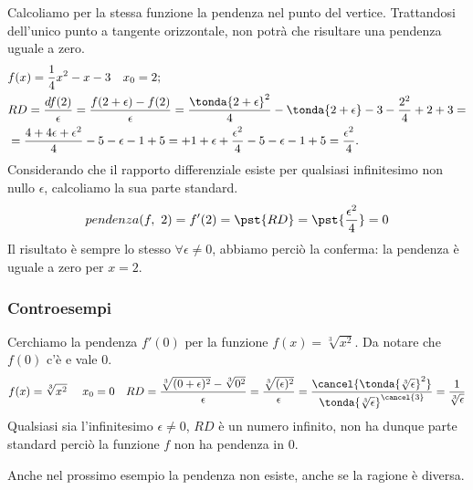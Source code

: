 \begin{esempio}
Calcoliamo per la stessa funzione la pendenza nel punto del vertice. 
Trattandosi dell'unico punto a tangente orizzontale, non potrà che risultare 
una pendenza uguale a zero.\\
\begin{align*}
 &f(x) = \dfrac{1}{4} x^2 -x -3 \quad x_0=2;\\
 &RD=\frac{df(2)}{\epsilon}=\frac{f(2+\epsilon) - f(2)}{\epsilon}=
  \frac{\tonda{2 +\epsilon}^2}{4}  -\tonda{2 +\epsilon} -3 - 
           \frac{2^2}{4}  +2 +3 =\\
  &= \dfrac{4 +4 \epsilon +\epsilon^2}{4} -5 -\epsilon - 1 +5 =
 +1+ \epsilon +\frac{\epsilon^2}{4} -5 -\epsilon - 1 +5 =
 \frac{\epsilon^2}{4}.
  \end{align*}
Considerando che il rapporto differenziale esiste per qualsiasi infinitesimo 
non nullo \(\epsilon\), calcoliamo la sua parte standard.
\[pendenza(f,~2) = f'(2) = \pst{RD}=\pst{\frac{\epsilon^2}{4}}=0\]
Il risultato è sempre lo stesso \(\forall \epsilon \ne 0\), abbiamo 
perciò la conferma: la pendenza è uguale a zero per \(x=2\).
\end{esempio}

\subsubsection{Controesempi}
\label{subsubsec:controesempi}
Cerchiamo la pendenza \(f'(0)\) per la funzione \(f(x)=\sqrt[3]{x^2}\). Da 
notare che \(f(0)\) c’è e vale \(0\).
\begin{align*}
&f(x)=\sqrt[3]{x^2}\ \quad x_0=0
&RD=\frac{\sqrt[3]{(0+\epsilon)^2}-\sqrt[3]{0^2}}{\epsilon}=
 \frac{\sqrt[3]{(\epsilon)^2}}{\epsilon}=
 \frac{\cancel{\tonda{\sqrt[3]{\epsilon}}^2}}
 {\tonda{\sqrt[3]{\epsilon}}^{\cancel{3}}}=
 \frac{1}{\sqrt[3]{\epsilon}}
\end{align*}
Qualsiasi sia l'infinitesimo \(\epsilon \neq 0\), \(RD\) è un numero
infinito, non ha dunque parte standard perciò la funzione \(f\) non ha 
pendenza in \(0\).

Anche nel prossimo esempio la pendenza non esiste, anche se la ragione è 
diversa.

